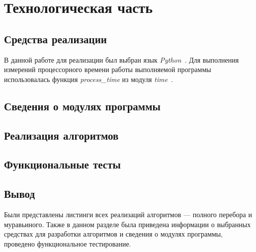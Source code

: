 \chapter{Технологическая часть}

\section{Средства реализации}

В данной работе для реализации был выбран язык \textit{Python}~\cite{python-lang}.
Для выполнения измерений процессорного времени работы выполняемой программы использовалась функция \textit{process\_time} из модуля \textit{time}~\cite{python-lang-time}.

\section{Сведения о модулях программы}

\section{Реализация алгоритмов}

\section{Функциональные тесты}

\section*{Вывод}

Были представлены листинги всех реализаций алгоритмов — полного перебора и муравьиного.
Также в данном разделе была приведена информации о выбранных средствах для разработки алгоритмов и сведения о модулях программы, проведено функциональное тестирование.